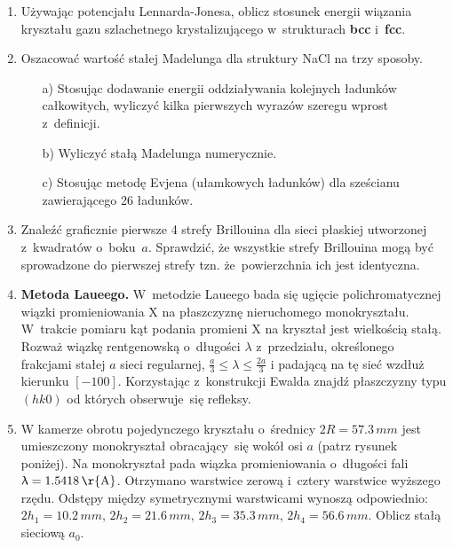 \documentclass[a4paper,11pt]{article}
\begin{document}
\begin{enumerate}
\item Używając potencjału Lennarda-Jonesa, oblicz stosunek energii
  wiązania kryształu gazu szlachetnego krystalizującego w~strukturach
  \textbf{bcc} i~\textbf{fcc}.

\item Oszacować wartość stałej Madelunga dla struktury NaCl na trzy
  sposoby.

  \begin{itemize}
  \item[a)] Stosując dodawanie energii oddziaływania kolejnych
    ładunków całkowitych, wyliczyć kilka pierwszych wyrazów szeregu
    wprost z~definicji.

  \item[b)] Wyliczyć stałą Madelunga numerycznie.

  \item[c)] Stosując metodę Evjena (ułamkowych ładunków) dla sześcianu
    zawierającego 26 ładunków.

  \end{itemize}

\item Znaleźć graficznie pierwsze 4 strefy Brillouina dla sieci
  płaskiej utworzonej z~kwadratów o~boku~$a$. Sprawdzić, że wszystkie
  strefy Brillouina mogą być sprowadzone do pierwszej strefy tzn.
  że~powierzchnia ich jest identyczna.

\item \textbf{Metoda Laueego.} W~metodzie Laueego bada się ugięcie
  polichromatycznej wiązki promieniowania X na płaszczyznę
  nieruchomego monokryształu. W~trakcie pomiaru kąt podania promieni X
  na kryształ jest wielkością stałą. Rozważ wiązkę rentgenowską
  o~długości $\lambda$ z~przedziału, określonego frakcjami stałej $a$ sieci
  regularnej, $\frac{ a }{ 3 } \leq \lambda \leq \frac{ 2a }{ 3 }$ i padającą na
  tę sieć wzdłuż kierunku $[-100]$. Korzystając z~konstrukcji Ewalda
  znajdź płaszczyzny typu $(hk0)$ od których obserwuje~się refleksy.

\item W kamerze obrotu pojedynczego kryształu o~średnicy
  $2R = 57.3 \, \si{mm}$ jest umieszczony monokryształ obracający~się
  wokół osi $a$ (patrz rysunek poniżej). Na monokryształ pada wiązka
  promieniowania o~długości fali $\lambda = 1.5418 \, \si{\r{A}}$. Otrzymano
  warstwice zerową i~cztery warstwice wyższego rzędu. Odstępy między
  symetrycznymi warstwicami wynoszą odpowiednio:
  $2 h_{ 1 } = 10.2 \, \si{mm}$, $2 h_{ 2 } = 21.6 \, \si{mm}$,
  $2 h_{ 3 } = 35.3 \, \si{mm}$, $2 h_{ 4 } = 56.6 \, \si{mm}$. Oblicz
  stałą sieciową $a_{ 0 }$.


\end{enumerate}
\end{document}
